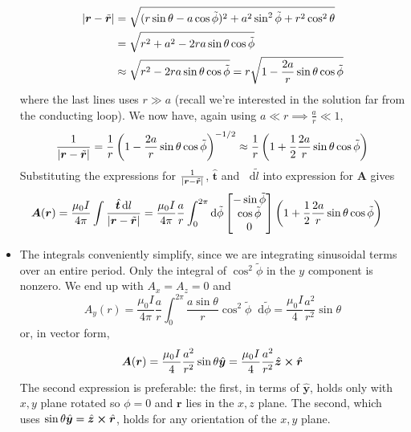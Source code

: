 \documentclass[11pt, a4paper]{article}
\newcommand{\diff}{\mathop{}\!\mathrm{d}} %
\renewcommand{\vec}[1]{\bm{#1}} %
\newcommand{\uvec}[1]{\hat{\vec{#1}}} %
\newcommand{\tvec}[1]{\tilde{\vec{#1}}} %
\renewcommand{\r}{\vec{r}}
\newcommand{\A}{\vec{A}}  %
\begin{document}
\begin{itemize}
	\begin{align*}
		\abs{\r - \tvec{r}} &= \sqrt{(r \sin \theta - a \cos \tilde{\phi} )^{2} + a^{2}\sin^{2}\tilde{\phi} + r^{2}\cos^{2} \theta}\\
		& = \sqrt{r^{2} + a^{2} - 2ra \sin \theta \cos \tilde \phi}\\
		&\approx \sqrt{r^{2} - 2ra \sin \theta \cos \tilde \phi} = r \sqrt{1 - \frac{2a}{r}\sin \theta \cos \tilde{\phi}}
	\end{align*}
	where the last lines uses $ r \gg a $ (recall we're interested in the solution far from the conducting loop). We now have, again using $ a \ll r \implies \frac{a}{r} \ll 1 $,
	\begin{equation*}
		\frac{1}{\abs{\r - \tvec{r}}} = \frac{1}{r} \left(1 - \frac{2a}{r}\sin \theta \cos \tilde{\phi}\right)^{-1/2} \approx \frac{1}{r}\left(1 + \frac{1}{2}  \frac{2a}{r}\sin \theta \cos \tilde{\phi}\right)
	\end{equation*}
	Substituting the expressions for $ \frac{1}{\abs{\r - \tvec{r}}} $, $ \uvec{t} $ and $ \diff \tilde{l} $ into expression for $ \A $ gives
	\begin{align*}
		\A(\r) &= \frac{\mu_{0}I}{4\pi} \int \frac{\uvec{t} \diff l}{\abs{\r - \tvec{r}}} = \frac{\mu_{0}I}{4\pi} \frac{a}{r} \int_{0}^{2\pi} \diff \tilde{\phi}  
		\begin{bmatrix}
			- \sin \tilde{\phi}\\
			\cos \tilde{\phi}\\
			0
		\end{bmatrix}
		\left(1 + \frac{1}{2}  \frac{2a}{r}\sin \theta \cos \tilde{\phi}\right)
	\end{align*}
	
	\item The integrals conveniently simplify, since we are integrating sinusoidal terms over an entire period. Only the integral of $ \cos^{2} \tilde{\phi} $ in the $ y $ component is nonzero. We end up with $ A_{x} = A_{z} = 0 $ and
	\begin{equation*}
		A_{y}(r) = \frac{\mu_{0}I}{4\pi} \frac{a}{r} \int_{0}^{2\pi}
		 \frac{a\sin \theta}{r} \cos^{2} \tilde{\phi} \diff \tilde{\phi} = \frac{\mu_{0}I}{4} \frac{a^{2}}{r^{2}}  \sin \theta 
	\end{equation*}
	or, in vector form,
	\begin{equation*}
		\A(\r) = \frac{\mu_{0}I}{4} \frac{a^{2}}{r^{2}}  \sin \theta \uvec{y} = \frac{\mu_{0}I}{4} \frac{a^{2}}{r^{2}} \uvec{z} \cross \uvec{r}
	\end{equation*}
	The second expression is preferable: the first, in terms of $ \uvec{y} $, holds only with $ x, y $ plane rotated so $ \phi = 0 $ and $ \r $ lies in the $ x, z $ plane. The second, which uses $ \sin \theta \uvec{y} = \uvec{z} \cross \uvec{r} $, holds for any orientation of the $ x, y $ plane. 
	

\end{itemize}
\end{document}
